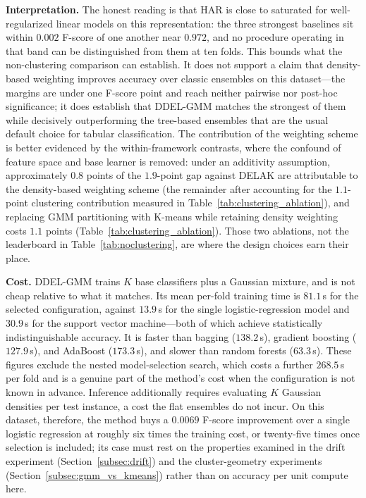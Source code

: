 \documentclass[lettersize,journal]{IEEEtran}
\begin{document}
		\noindent \textbf{Interpretation.} The honest reading is that HAR is close to saturated for well-regularized linear models on this representation: the three strongest baselines sit within $0.002$ F-score of one another near $0.972$, and no procedure operating in that band can be distinguished from them at ten folds. This bounds what the non-clustering comparison can establish. It does not support a claim that density-based weighting improves accuracy over classic ensembles on this dataset---the margins are under one F-score point and reach neither pairwise nor post-hoc significance; it does establish that DDEL-GMM matches the strongest of them while decisively outperforming the tree-based ensembles that are the usual default choice for tabular classification. The contribution of the weighting scheme is better evidenced by the within-framework contrasts, where the confound of feature space and base learner is removed: under an additivity assumption, approximately $0.8$ points of the $1.9$-point gap against DELAK are attributable to the density-based weighting scheme (the remainder after accounting for the $1.1$-point clustering contribution measured in Table~\ref{tab:clustering_ablation}), and replacing GMM partitioning with K-means while retaining density weighting costs $1.1$ points (Table~\ref{tab:clustering_ablation}). Those two ablations, not the leaderboard in Table~\ref{tab:noclustering}, are where the design choices earn their place.
		
		\noindent \textbf{Cost.} DDEL-GMM trains $K$ base classifiers plus a Gaussian mixture, and is not cheap relative to what it matches. Its mean per-fold training time is $81.1$\,s for the selected configuration, against $13.9$\,s for the single logistic-regression model and $30.9$\,s for the support vector machine---both of which achieve statistically indistinguishable accuracy. It is faster than bagging ($138.2$\,s), gradient boosting ($127.9$\,s), and AdaBoost ($173.3$\,s), and slower than random forests ($63.3$\,s). These figures exclude the nested model-selection search, which costs a further $268.5$\,s per fold and is a genuine part of the method's cost when the configuration is not known in advance. Inference additionally requires evaluating $K$ Gaussian densities per test instance, a cost the flat ensembles do not incur. On this dataset, therefore, the method buys a $0.0069$ F-score improvement over a single logistic regression at roughly six times the training cost, or twenty-five times once selection is included; its case must rest on the properties examined in the drift experiment (Section~\ref{subsec:drift}) and the cluster-geometry experiments (Section~\ref{subsec:gmm_vs_kmeans}) rather than on accuracy per unit compute here.
		
\end{document}
